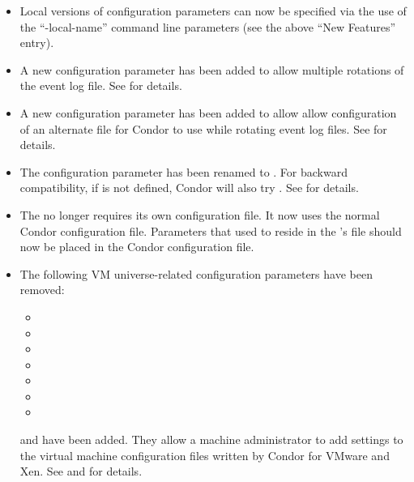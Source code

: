 \begin{itemize}

\item Local versions of configuration parameters can now be specified
  via the use of the ``-local-name'' command line parameters (see the
  above ``New Features'' entry).

\item A new configuration parameter
   has been added to allow
  multiple rotations of the event log file.
  See \pageref{param:EventLogMaxRotations} for details.

\item A new configuration parameter
   has been added to allow
  allow configuration of an alternate file for Condor to use while
  rotating event log files.
  See \pageref{param:EventLogRotationLock} for details.

\item The configuration parameter  has been
  renamed to .  For backward
  compatibility, if  is not defined,
  Condor will also try .
  See \pageref{param:EventLogMaxSize} for details.

\item The  no longer requires its own configuration
  file. It now uses the normal Condor configuration file. Parameters
  that used to reside in the 's file should now be placed
  in the Condor configuration file.

\item The following VM universe-related configuration parameters have
  been removed:
  \begin{itemize}
  \item {}
  \item {}
  \item {}
  \item {}
  \item {}
  \item {}
  \item {}
  \end{itemize}

  and  have been added. They allow
  a machine administrator to add settings to the virtual machine
  configuration files written by Condor for VMware and Xen.
  See \pageref{param:VMwareLocalSettingsFile} and
  \pageref{param:XenLocalSettingsFile} for details.


\end{itemize}

